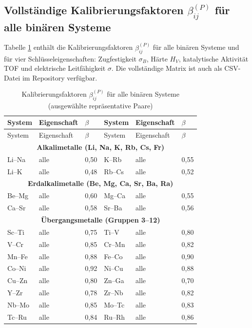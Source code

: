 \documentclass[12pt,a4paper]{article}
\begin{document}
\subsection{Vollständige Kalibrierungsfaktoren \(\beta_{ij}^{(P)}\) für alle binären Systeme}
\label{subsec:beta-full}

Tabelle \ref{tab:beta-full} enthält die Kalibrierungsfaktoren \(\beta_{ij}^{(P)}\) für alle binären Systeme und für vier Schlüsseleigenschaften: Zugfestigkeit \(\sigma_B\), Härte \(H_V\), katalytische Aktivität TOF und elektrische Leitfähigkeit \(\sigma\). Die vollständige Matrix ist auch als CSV-Datei im Repository verfügbar.

\begin{longtable}{p{1.5cm}p{1.5cm}p{1.2cm}p{1.2cm}p{1.2cm}p{1.2cm}}
	\caption{Kalibrierungsfaktoren \(\beta_{ij}^{(P)}\) für alle binären Systeme (ausgewählte repräsentative Paare)} \label{tab:beta-full} \\
	\toprule
	System & Eigenschaft & \(\beta\) & System & Eigenschaft & \(\beta\) \\
	\midrule
	\endfirsthead
	\toprule
	System & Eigenschaft & \(\beta\) & System & Eigenschaft & \(\beta\) \\
	\midrule
	\endhead
	\multicolumn{6}{c}{\textbf{Alkalimetalle (Li, Na, K, Rb, Cs, Fr)}} \\
	Li–Na & alle & 0,50 & K–Rb & alle & 0,55 \\
	Li–K  & alle & 0,48 & Rb–Cs & alle & 0,52 \\
	\multicolumn{6}{c}{\textbf{Erdalkalimetalle (Be, Mg, Ca, Sr, Ba, Ra)}} \\
	Be–Mg & alle & 0,60 & Mg–Ca & alle & 0,55 \\
	Ca–Sr & alle & 0,58 & Sr–Ba & alle & 0,56 \\
	\multicolumn{6}{c}{\textbf{Übergangsmetalle (Gruppen 3–12)}} \\
	Sc–Ti & alle & 0,75 & Ti–V & alle & 0,80 \\
	V–Cr  & alle & 0,85 & Cr–Mn & alle & 0,82 \\
	Mn–Fe & alle & 0,88 & Fe–Co & alle & 0,90 \\
	Co–Ni & alle & 0,92 & Ni–Cu & alle & 0,88 \\
	Cu–Zn & alle & 0,80 & Zn–Ga & alle & 0,70 \\
	Y–Zr  & alle & 0,78 & Zr–Nb & alle & 0,82 \\
	Nb–Mo & alle & 0,85 & Mo–Tc & alle & 0,83 \\
	Tc–Ru & alle & 0,84 & Ru–Rh & alle & 0,86 \\

\end{longtable}
\end{document}
